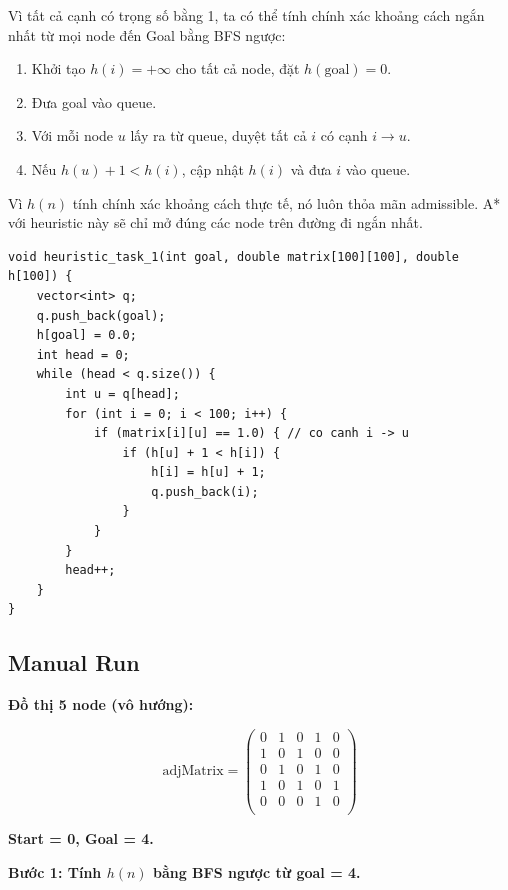 \documentclass[13pt,a4paper]{article}
\begin{document}
Vì tất cả cạnh có trọng số bằng 1, ta có thể tính chính xác khoảng cách ngắn nhất từ mọi node đến Goal bằng BFS ngược:

\begin{enumerate}
    \item Khởi tạo $h(i) = +\infty$ cho tất cả node, đặt $h(\text{goal}) = 0$.
    \item Đưa goal vào queue.
    \item Với mỗi node $u$ lấy ra từ queue, duyệt tất cả $i$ có cạnh $i \to u$.
    \item Nếu $h(u)+1 < h(i)$, cập nhật $h(i)$ và đưa $i$ vào queue.
\end{enumerate}

Vì $h(n)$ tính chính xác khoảng cách thực tế, nó luôn thỏa mãn admissible. A* với heuristic này sẽ chỉ mở đúng các node trên đường đi ngắn nhất.

\begin{lstlisting}[caption={Hàm heuristic\_task\_1 trong Algo.cpp}]
void heuristic_task_1(int goal, double matrix[100][100], double h[100]) {
    vector<int> q;
    q.push_back(goal);
    h[goal] = 0.0;
    int head = 0;
    while (head < q.size()) {
        int u = q[head];
        for (int i = 0; i < 100; i++) {
            if (matrix[i][u] == 1.0) { // co canh i -> u
                if (h[u] + 1 < h[i]) {
                    h[i] = h[u] + 1;
                    q.push_back(i);
                }
            }
        }
        head++;
    }
}
\end{lstlisting}

\subsection{Manual Run}

\textbf{Đồ thị 5 node (vô hướng):}

\[
\text{adjMatrix} =
\begin{pmatrix}
0 & 1 & 0 & 1 & 0 \\
1 & 0 & 1 & 0 & 0 \\
0 & 1 & 0 & 1 & 0 \\
1 & 0 & 1 & 0 & 1 \\
0 & 0 & 0 & 1 & 0 \\
\end{pmatrix}
\]

\textbf{Start = 0, Goal = 4.}

\textbf{Bước 1: Tính $h(n)$ bằng BFS ngược từ goal = 4.}
\end{document}
